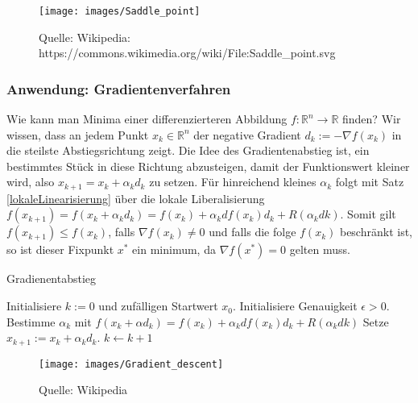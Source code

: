 \begin{figure}[H]
      \centering
    \texttt{[image: images/Saddle\_point]}
      \caption{Quelle: Wikipedia: https://commons.wikimedia.org/wiki/File:Saddle\_point.svg}

\end{figure}



\subsubsection*{Anwendung: Gradientenverfahren} 
Wie kann man Minima einer  differenzierteren Abbildung $f: \mathbb{R}^n \to \mathbb{R}$ finden? 
Wir wissen, dass an jedem Punkt $x_k \in  \mathbb{R}^n$ der negative Gradient  $d_k := -\nabla f (x_k)$ in die steilste Abstiegsrichtung zeigt.
Die Idee des Gradientenabstieg ist, ein bestimmtes  Stück in diese Richtung abzusteigen, damit der Funktionswert kleiner wird, also $x_{k+1} = x_k + \alpha_k d_k$ zu setzen. Für hinreichend kleines $\alpha_k$ folgt mit Satz \ref{lokaleLinearisierung} über die lokale Liberalisierung  
$f(x_{k+1}) = f (x_k + \alpha_k d_k) =  f(x_k) + \alpha_k df(x_k)d_k + R( \alpha_k dk)$.  Somit gilt $f(x_{k+1}) \leq f(x_k)$, falls $\nabla f(x_k) \neq 0$ und falls die folge $f(x_k)$ beschränkt ist, so ist  dieser Fixpunkt $x^*$ ein minimum, da $\nabla f(x^*) = 0$ gelten muss.  

\begin{algorithm}
\caption{Gradienentabstieg}
\begin{algorithmic}[1]


    \State Initialisiere $k:=0$ und zufälligen Startwert $x_0$.
\State Initialisiere Genauigkeit $\epsilon > 0$.
      
        \State Bestimme $\alpha_k$  mit $f (x_k + \alpha d_k) =  f(x_k) + \alpha_k df(x_k)d_k + R( \alpha_k dk)$ 
        \State Setze $x_{k+1} := x_k  + \alpha_k d_k$. 
 	\State  $k \leftarrow k+1$ 
    \EndWhile  \label{Gradientenverfahren}


\end{algorithmic}
\end{algorithm}

\begin{figure}[H]
      \centering
    \texttt{[image: images/Gradient\_descent]}
      \caption{Quelle: Wikipedia}
\end{figure}



